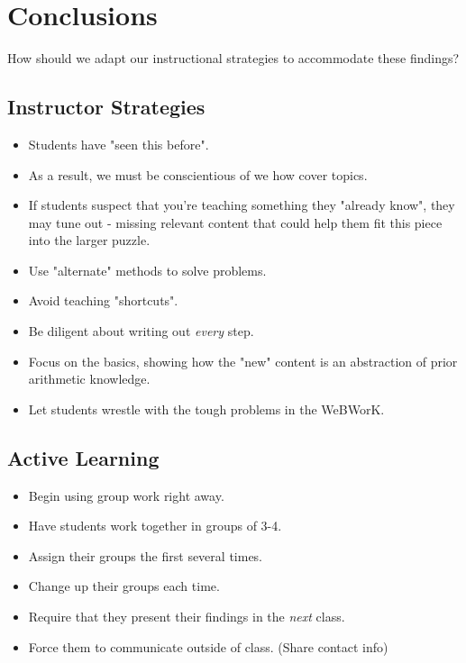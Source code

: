 \documentclass{ximera}
\begin{document}
\section{Conclusions}

How should we adapt our instructional strategies to accommodate these findings?

\subsection{Instructor Strategies}

\begin{itemize}
 \item Students have "seen this before". 
 \item As a result, we must be conscientious of we how cover topics.
 \item If students suspect that you're teaching something they "already know", they may tune out - missing relevant content that could help them fit this piece into the larger puzzle.
 \item Use "alternate" methods to solve problems.
 \item Avoid teaching "shortcuts". 
 \item Be diligent about writing out \emph{every} step. 
 \item Focus on the basics, showing how the "new" content is an abstraction of prior arithmetic knowledge.
 \item Let students wrestle with the tough problems in the WeBWorK.
\end{itemize}

\subsection{Active Learning}

\begin{itemize}
 \item Begin using group work right away.
 \item Have students work together in groups of 3-4. 
 \item Assign their groups the first several times. 
 \item Change up their groups each time. 
 \item Require that they present their findings in the \emph{next} class. 
 \item Force them to communicate outside of class. (Share contact info)
\end{itemize}
\end{document}
